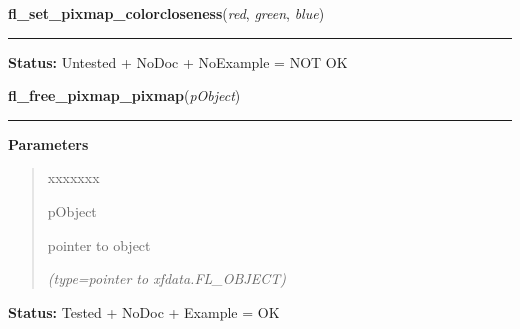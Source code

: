     \label{xformslib:library:fl_set_pixmap_colorcloseness}

    \vspace{0.5ex}

\hspace{.8\funcindent}\begin{boxedminipage}{\funcwidth}

    \raggedright \textbf{fl\_set\_pixmap\_colorcloseness}(\textit{red}, \textit{green}, \textit{blue})

    \vspace{-1.5ex}

    \rule{\textwidth}{0.5\fboxrule}
\setlength{\parskip}{2ex}
\setlength{\parskip}{1ex}
\textbf{Status:} Untested + NoDoc + NoExample = NOT OK



    \end{boxedminipage}

    \label{xformslib:library:fl_free_pixmap_pixmap}

    \vspace{0.5ex}

\hspace{.8\funcindent}\begin{boxedminipage}{\funcwidth}

    \raggedright \textbf{fl\_free\_pixmap\_pixmap}(\textit{pObject})

    \vspace{-1.5ex}

    \rule{\textwidth}{0.5\fboxrule}
\setlength{\parskip}{2ex}
\setlength{\parskip}{1ex}
      \textbf{Parameters}
      \vspace{-1ex}

      \begin{quote}
        \begin{Ventry}{xxxxxxx}

          \item[pObject]

          pointer to object

            {\it (type=pointer to xfdata.FL\_OBJECT)}

        \end{Ventry}

      \end{quote}

\textbf{Status:} Tested + NoDoc + Example = OK



    \end{boxedminipage}

